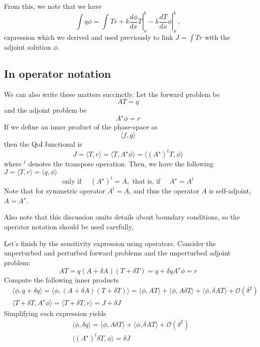 \documentclass[11pt]{article}
\begin{document}
From this, we note that we have
\[
\int q \phi = \int T r + \left. k\frac{d\phi}{dx}T\right|_a^b  - \left. k\frac{dT}{dx}\phi\right|_a^b \,,
\] 
expression which we derived and used previously to link $J=\int Tr$ with the adjoint solution $\phi$.


\subsection{In operator notation}

We can also write these matters succinctly. Let the forward problem be
\[
A T = q
\]
and the adjoint problem be
\[
A^\star \phi = r
\]
If we define an inner product of the phase-space as
\[
\langle f,g \rangle
\]
then the QoI functional is
\begin{equation}
J = \langle T, r \rangle = \langle T, A^\star \phi \rangle = \langle \left(A^{\star}\right)^t T, \phi \rangle 
\end{equation}
where $^t$ denotes the transpose operation. Then, we have the following $J = \langle T, r \rangle = \langle q, \phi \rangle$ 
\[
\text{only if } \quad \left(A^{\star}\right)^t = A, \text{  that is, if  } \quad A^{\star} = A^t
\]
Note that for symmetric operator $A^t=A$, and thus the operator $A$ is self-adjoint, $A=A^{\star}$.

Also note that this discussion omits details about boundary conditions, so the operator notation should be used carefully,

Let's finish by the sensitivity expression using operators. Consider the unperturbed and perturbed forward problems and the unperturbed adjoint problem:
\begin{subequations}
\begin{equation}\label{eq:linear_oper_for_unpert}
A T =q
\end{equation}
\begin{equation}\label{eq:linear_oper_for_pert}
(A+\delta A)(T+\delta T) = q + \delta q
\end{equation}
\begin{equation}\label{eq:linear_oper_adj_unpert}
A^\star \phi = r
\end{equation}
\end{subequations}
Compute the following inner products
\begin{align}
&\langle \phi, q+\delta q\rangle = \langle \phi, (A+\delta A)(T+\delta T)\rangle  = \langle \phi, AT \rangle + \langle \phi, A\delta T\rangle + \langle \phi, \delta A T \rangle + \mathcal{O}(\delta^2) \\
&\langle T+\delta T, A^\star \phi  \rangle = \langle T+\delta T, r \rangle = J + \delta J
\end{align}
Simplifying each expression yields
\begin{align}
&\langle \phi, \delta q\rangle =  \langle \phi, A\delta T\rangle + \langle \phi, \delta A T \rangle + \mathcal{O}(\delta^2) \\
&\langle (A^\star)^t\delta T, \phi  \rangle = \delta J
\end{align}
\end{document}
